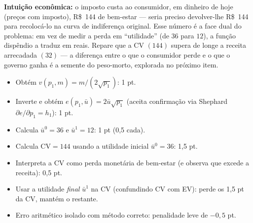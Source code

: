 \begin{solucao}
\textbf{Intuição econômica:} o imposto custa ao consumidor, em dinheiro de hoje (preços com imposto), R\$~144 de bem-estar --- seria preciso devolver-lhe R\$~144 para recolocá-lo na curva de indiferença original. Esse número é a face dual do problema: em vez de medir a perda em ``utilidade'' (de $36$ para $12$), a função dispêndio a traduz em reais. Repare que a CV $(144)$ supera de longe a receita arrecadada $(32)$ --- a diferença entre o que o consumidor perde e o que o governo ganha é a semente do peso-morto, explorada no próximo item.
\rubricalabel
\begin{itemize}
\item Obtém $v(p_1,m)=m/(2\sqrt{p_1})$: 1 pt.
\item Inverte e obtém $e(p_1,\bar u)=2\bar u\sqrt{p_1}$ (aceita confirmação via Shephard $\partial e/\partial p_1=h_1$): 1 pt.
\item Calcula $\bar u^{0}=36$ e $\bar u^{1}=12$: 1 pt (0{,}5 cada).
\item Calcula $\mathrm{CV}=144$ usando a utilidade inicial $\bar u^{0}=36$: 1{,}5 pt.
\item Interpreta a CV como perda monetária de bem-estar (e observa que excede a receita): 0{,}5 pt.
\item Usar a utilidade \emph{final} $\bar u^{1}$ na CV (confundindo CV com EV): perde os 1{,}5 pt da CV, mantém o restante.
\item Erro aritmético isolado com método correto: penalidade leve de $-0{,}5$ pt.
\end{itemize}
\end{solucao}


